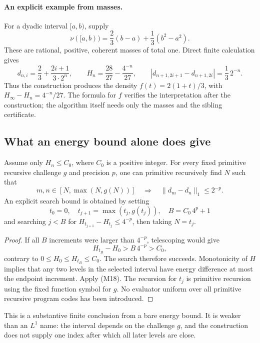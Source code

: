\paragraph{An explicit example from masses.}
For a dyadic interval \([a,b)\), supply
\[
 \nu([a,b))=\frac23(b-a)+\frac13(b^2-a^2).
 \]
These are rational, positive, coherent masses of total one.  Direct finite
calculation gives
\[
 d_{n,i}=\frac23+\frac{2i+1}{3\cdot2^n},
 \qquad
 H_n=\frac{28}{27}-\frac{4^{-n}}{27},
 \qquad
 |d_{n+1,2i+1}-d_{n+1,2i}|=\frac13\,2^{-n}.
 \]
Thus the construction produces the density \(f(t)=2(1+t)/3\), with
\(H_\infty-H_n=4^{-n}/27\).  The formula for \(f\) verifies the interpretation
after the construction; the algorithm itself needs only the masses and the
sibling certificate.

\subsection{What an energy bound alone does give}

\begin{theorem}\label{m:metastability}
Assume only \(H_n\le C_0\), where \(C_0\) is a positive integer.
For every fixed primitive recursive challenge \(g\) and precision \(p\),
one can primitive recursively find \(N\) such that
\[
 m,n\in[N,\max(N,g(N))]
 \quad\Longrightarrow\quad
 \|d_m-d_n\|_1\le2^{-p}.
 \tag{M24}
\]
An explicit search bound is obtained by setting
\[
 t_0=0,\quad t_{j+1}=\max(t_j,g(t_j)),\quad
 B=C_0\,4^p+1
 \]
and searching \(j<B\) for
\(H_{t_{j+1}}-H_{t_j}\le4^{-p}\), then taking \(N=t_j\).
\end{theorem}

\begin{proof}
If all \(B\) increments were larger than \(4^{-p}\), telescoping would give
\[
 H_{t_B}-H_0>B\,4^{-p}>C_0,
 \]
contrary to \(0\le H_0\le H_{t_B}\le C_0\).
The search therefore succeeds.  Monotonicity of \(H\) implies that any two
levels in the selected interval have energy difference at most the endpoint
increment.  Apply (M18).
The recursion for \(t_j\) is primitive recursion using the fixed function
symbol for \(g\).  No evaluator uniform over all primitive recursive program
codes has been introduced.
\end{proof}

This is a substantive finite conclusion from a bare energy bound.  It is
weaker than an \(L^1\) name: the interval depends on the challenge \(g\), and
the construction does not supply one index after which all later levels are
close.


